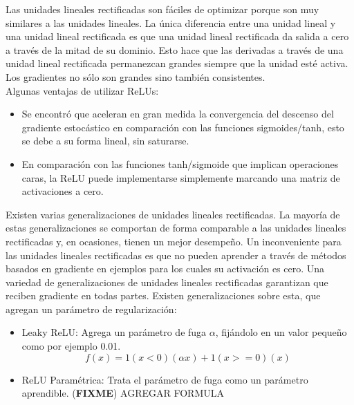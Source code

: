 \documentclass[a4paper,11pt,spanish]{book}
\newcommand*{\FIXME}[1]{{(\textbf{FIXME}) {#1}}}
\begin{document}
	    Las unidades lineales rectificadas son fáciles de optimizar porque son muy similares a las unidades lineales.
	    La única diferencia entre una unidad lineal y una unidad lineal rectificada es que una unidad lineal rectificada da salida a cero a través de la mitad de su dominio.
	    Esto hace que las derivadas a través de una unidad lineal rectificada permanezcan grandes siempre que la unidad esté activa.
	    Los gradientes no sólo son grandes sino también consistentes.\\
	    Algunas ventajas de utilizar ReLUs:
	    \begin{itemize}
	      \item Se encontró que aceleran en gran medida la convergencia del descenso del gradiente estocástico en comparación con las funciones sigmoides/tanh, esto se debe a su forma lineal, sin saturarse.
	      \item En comparación con las funciones tanh/sigmoide que implican operaciones caras, la ReLU puede implementarse simplemente marcando una matriz de activaciones a cero.
	    \end{itemize}

	    Existen varias generalizaciones de unidades lineales rectificadas. La mayoría de estas generalizaciones se comportan de forma comparable a las unidades lineales rectificadas
	    y, en ocasiones, tienen un mejor desempeño. Un inconveniente para las unidades lineales rectificadas es que no pueden aprender a través de métodos basados ​​en
	    gradiente en ejemplos para los cuales su activación es cero. Una variedad de generalizaciones de unidades lineales rectificadas garantizan que reciben gradiente en
	    todas partes. Existen generalizaciones sobre esta, que agregan un parámetro de regularización:
	    \begin{itemize}
	      \item Leaky ReLU: Agrega un parámetro de fuga $\alpha$, fijándolo en un valor pequeño como por ejemplo 0.01.
		\begin{equation}
		  f(x)=1(x<0)(\alpha x)+1(x>=0)(x)
		\end{equation}
	      \item ReLU Paramétrica: Trata el parámetro de fuga como un parámetro aprendible. \FIXME{AGREGAR FORMULA}
	    \end{itemize}
\end{document}
